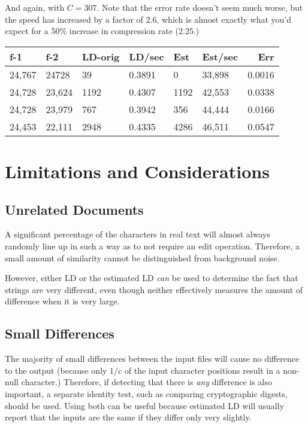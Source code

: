 \documentclass[html]{article}    %
\begin{document}
And again, with $C=307$.
Note that the error rate doesn't seem much worse, but the speed has increased by a factor of 2.6, which is almost
exactly what you'd expect for a 50\% increase in compression rate (2.25.)

\vspace {10 mm}
\begin {tabular} {|l|l|l|l|l|l|r|} \hline \hline
 f-1  		& f-2 		& LD-orig	&LD/sec		& Est 		& Est/sec	 & Err  	\\ \hline
 \hline
 24,767 	& 24728  	& 39  		& 0.3891	& 0  	 	& 33,898 	 & 0.0016 	\\ \hline
 24,728 	& 23,624  	& 1192  	& 0.4307	& 1192   	& 42,553 	 & 0.0338 	\\ \hline
 24,728 	& 23,979  	& 767  		& 0.3942	& 356   	& 44,444  	 & 0.0166 	\\ \hline
 24,453 	& 22,111  	& 2948   	& 0.4335	& 4286   	& 46,511 	 & 0.0547 	\\ \hline
\end {tabular} 

\section{Limitations and Considerations}

\subsection{Unrelated Documents}

A significant percentage of the characters in real text will almost always randomly line up in such a way as to not require an 
edit operation.  Therefore, a small amount of similarity cannot be distinguished from background noise.

However, either LD or the estimated LD {\em can } be used to determine the fact that strings are very different, even though 
neither effectively measures the amount of difference when it is very large.

\subsection{Small Differences }

The majority of small differences between the input files will cause no difference to the output (because only $1/c$ of the input 
character positions result in a  non-null character.) 
Therefore, if detecting that there is {\em any} difference is also important, a separate identity test, such as comparing
cryptographic digests, should be used.
Using both can be useful because estimated LD will usually report that the inputs are the same if they differ only very slightly.
\end{document}
